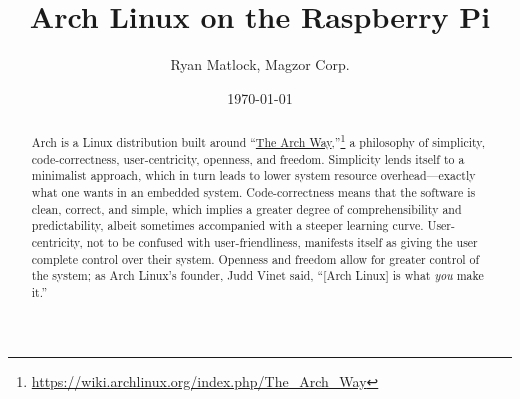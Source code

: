 \documentclass[12pt,letterpaper]{article}
\newcommand\gittext[1]{\texttt{#1}}
\begin{document}
\title{Arch Linux on the Raspberry Pi}
\author{Ryan Matlock, Magzor Corp.}
\date{\today}
\maketitle

\begin{abstract}
Arch is a Linux distribution built around ``\href{https://wiki.archlinux.org/index.php/The_Arch_Way}{The Arch Way},''\footnote{\url{https://wiki.archlinux.org/index.php/The_Arch_Way}} a philosophy of simplicity, code-correctness, user-centricity, openness, and freedom.  Simplicity lends itself to a minimalist approach, which in turn leads to lower system resource overhead---exactly what one wants in an embedded system.  Code-correctness means that the software is clean, correct, and simple, which implies a greater degree of comprehensibility and predictability, albeit sometimes accompanied with a steeper learning curve.  User-centricity, not to be confused with user-friendliness, manifests itself as giving the user complete control over their %
system.  %
Openness and freedom allow for greater control of the system; as Arch Linux's founder, Judd Vinet said, ``[Arch Linux] is what \emph{you} make it.''
\end{abstract}

\tableofcontents


\end{document}
